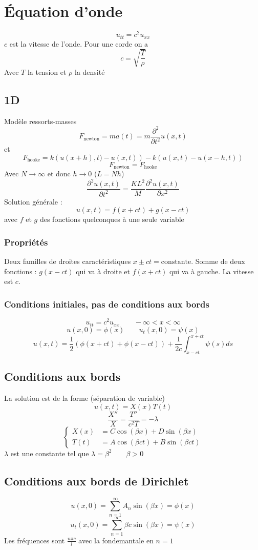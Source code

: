 \documentclass[resume]{subfiles}
\begin{document}
\section{Équation d'onde}
$$\boxed{u_{tt}=c^2u_{xx}}$$
$c$ est la vitesse de l'onde. Pour une corde on a
$$c=\sqrt{\frac{T}{\rho}}$$
Avec $T$ la tension et $\rho$ la densité
\subsection{1D}
Modèle ressorts-masses
$$F_\text{newton}=ma(t)=m\frac{\partial^2}{\partial t^2}u(x,t)$$
et
$$F_\text{hooke}=k\left(u(x+h),t)-u(x,t)\right)-k\left(u(x,t)-u(x-h,t)\right)$$
$$F_\text{newton}=F_\text{hooke}$$
Avec $N\to\infty$ et donc $h\to 0$ ($L=Nh$)
$$\frac{\partial^2 u(x,t)}{\partial t^2}=\frac{KL^2}{M}\frac{\partial^2 u(x,t)}{\partial x^2}$$
Solution générale :
$$\boxed{u(x,t)=f(x+ct)+g(x-ct)}$$
avec $f$ et $g$ des fonctions quelconques à une seule variable
\subsubsection{Propriétés}
Deux familles de droites caractéristiques $x\pm ct=\text{constante}$. Somme de deux fonctions : $g(x-ct)$ qui va à droite et $f(x+ct)$ qui va à gauche. La vitesse est $c$.
\subsubsection{Conditions initiales, pas de conditions aux bords}
$$u_{tt}=c^2u_{xx}\qquad -\infty<x<\infty$$
$$u(x,0)=\phi(x)\qquad u_t(x,0)=\psi(x)$$
$$u(x,t)=\frac{1}{2}\left(\phi(x+ct)+\phi(x-ct)\right)+\frac{1}{2c}\int_{x-ct}^{x+ct}\psi(s)ds$$
\subsection{Conditions aux bords}
La solution est de la forme (séparation de variable)
$$u(x,t)=X(x)T(t)$$
$$\frac{X''}{X}=\frac{T''}{c^2T}=-\lambda$$
\begin{equation}
\begin{cases}X(x)&=C\cos(\beta x)+D\sin(\beta x)\\T(t) &= A\cos(\beta ct)+B\sin(\beta ct)\end{cases}
\label{onde_avec_cb}
\end{equation}
$\lambda$ est une constante tel que $\lambda=\beta^2\qquad \beta>0$
\subsection{Conditions aux bords de Dirichlet}
$$u(x,0)=\sum_{n=1}^{\infty}A_n\sin\left(\beta x\right)=\phi(x)$$
$$u_t(x,0)=\sum_{n=1}^{\infty}\beta c\sin\left(\beta x\right)=\psi(x)$$
Les fréquences sont $\frac{n\pi c}{l}$ avec la fondemantale en $n=1$
\end{document}
